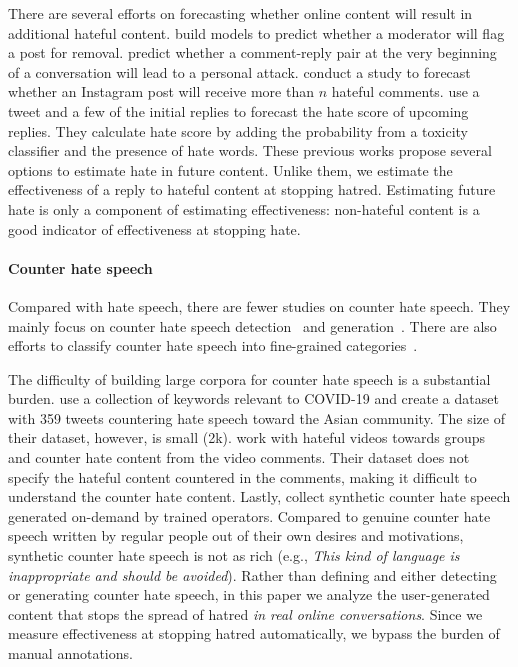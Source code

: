 \documentclass[11pt]{article}
\begin{document}
There are several efforts on forecasting whether online content will result in additional hateful content.
\citet{10.1145/2998181.2998213} build models to predict whether
a moderator will flag a post for removal.
\citet{zhang-etal-2018-conversations} predict whether a comment-reply pair at the very beginning of a conversation will lead to a personal attack.
\citet{DBLP:conf/icwsm/LiuGHC18} conduct a study to forecast whether an Instagram post will receive more than $n$ hateful comments.
\citet{DBLP:conf/kdd/DahiyaSSGCEMB021} use a tweet and a few of the initial replies to forecast the hate score of upcoming replies.
They calculate hate score by adding the probability from a toxicity classifier and the presence of hate words.
These previous works propose several options to estimate hate in future content.
Unlike them, we estimate the effectiveness of a reply to hateful content at stopping hatred.
Estimating future hate is only a component of estimating effectiveness: non-hateful content is a good indicator of effectiveness at stopping hate.


\paragraph{Counter hate speech}
Compared with hate speech, there are fewer studies on counter hate speech.
They mainly focus on counter hate speech detection~\cite{DBLP:conf/icwsm/MathewSTRSMG019,chung-etal-2019-conan,he2021racism,garland-etal-2020-countering} 
and generation~\cite{tekiroglu-etal-2020-generating,fanton-etal-2021-human,zhu-bhat-2021-generate}. 
There are also efforts to classify counter hate speech into fine-grained categories~\cite{DBLP:conf/icwsm/MathewSTRSMG019,chung-etal-2021-multilingual}. 

The difficulty of building large corpora for counter hate speech is a substantial burden.
\citet{he2021racism} use a collection of keywords relevant to COVID-19 and create a dataset with 359 tweets countering hate speech
toward the Asian community.
The size of their dataset, however, is small (2k). 
\citet{DBLP:conf/icwsm/MathewSTRSMG019} work with hateful videos towards groups
and counter hate content from the video comments.
Their dataset does not specify the hateful content countered in the comments, making it difficult to understand the counter hate content.
Lastly, \citet{chung-etal-2019-conan} collect synthetic counter hate speech generated on-demand by trained operators.
Compared to genuine counter hate speech written by regular people out of their own desires and motivations,
synthetic counter hate speech is not as rich (e.g., \emph{This kind of language is inappropriate and should be avoided}).
Rather than defining and either detecting or generating counter hate speech,
in this paper we analyze the user-generated content that stops the spread of hatred \emph{in real online conversations}.
Since we measure effectiveness at stopping hatred automatically, 
we bypass the burden of manual annotations.
\end{document}
